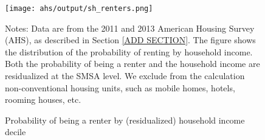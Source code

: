 \begin{figure}[h!]
    \centering
    \caption{Probability of being a renter by (residualized) household income decile}
    \label{fig:ahs_pr_renters}

    \texttt{[image: ahs/output/sh\_renters.png]}

    \begin{minipage}{.95\textwidth} \footnotesize
        \vspace{3mm}
        Notes: Data are from the 2011 and 2013 American Housing 
        Survey (AHS), as described in Section \ref{ADD SECTION}. 
        The figure shows the distribution of the probability of 
        renting by household income. 
        Both the probability of being a renter and the household income
        are residualized at the SMSA level.
        We exclude from the calculation non-conventional housing units, 
        such as mobile homes, hotels, rooming houses, etc.
    \end{minipage}
\end{figure}
